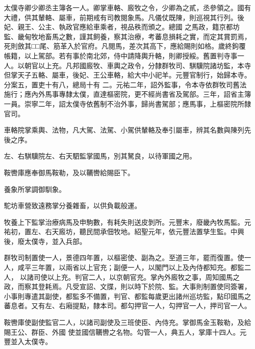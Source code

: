 \begin{pinyinscope}
 太僕寺卿少卿丞主簿各一人。卿掌車輅、廄牧之令，少卿為之貳，丞參領之。國有大禮，供其輦輅、屬車，前期戒有司教閱象馬。凡儀仗既陳，則巡視其行列。後妃、親王、公主、執政官應給車乘者，視品秩而頒之。總國
 之馬政，籍京都坊監、畿甸牧地畜馬之數，謹其飼養，察其治療，考蕃息損耗之實，而定其賞罰焉，死則斂其□□尾、筋革入於官府。凡閱馬，差次其高下，應給賜則如格。歲終鉤覆帳籍，以上駕部。若有事於南北郊，侍中請降輿升輅，則卿授綏。舊置判寺事一人。以朝官以上充。凡邦國廄牧、車輿之政令，分隸群牧司、騏驥院諸坊監，本寺但掌天子五輅、屬車，後妃、王公車輅，給大中小祀羊。元豐官制行，始歸本寺。分案五，置吏十有八，總局十有
 二。元祐二年，詔外監事，令本寺依群牧司舊法施行；應內外馬事專隸太僕，直達樞密院，更不經尚書省及駕部。三年，詔省主簿一員。崇寧二年，詔太僕寺依舊制不治外事，歸尚書駕部；應馬事，上樞密院所隸官司。



 車輅院掌乘輿、法物，凡大駕、法駕、小駕供輦輅及奉引屬車，辨其名數與陳列先後之序。



 左、右騏驥院左、右天駟監掌國馬，別其駑良，以待軍國之用。



 鞍轡庫應奉御馬鞍勒，及以韉轡給賜臣下。



 養象所掌調御馴象。



 駝坊車營致遠務掌分養雜畜，以供負載般運。



 牧養上下監掌治療病馬及申駒數，有耗失則送皮剝所。元豐末，廢畿內牧馬監。元祐初，置左、右天廄坊，聽民間承佃牧地。紹聖元年，依元豐法置孳生監。中興後，廢太僕寺，並入兵部。



 群牧司制置使一人，景德四年置，以樞密使、副為之。至道三年，罷而復置。使一人，咸平三年置，以兩省以上官充；副便一人，以閣門以上及內侍都知充。都監二人，
 以諸司使以上充。判官二人，以京朝官充。掌內外廄牧之事，周知國馬之政，而察其登耗焉。凡受宣詔、文牒，則以時下於院、監。大事則制置使同簽署，小事則專遣其副使，都監多不備置，判官、都監每歲更出諸州巡坊監，點印國馬之蕃息者。又有左、右廂提點，隸本司。都勾押官一人，勾押官一人，押司官一人。



 鞍轡庫使副使監官二人，以諸司副使及三班使臣、內侍充。掌御馬金玉鞍勒，及給賜王公、群臣、外國
 使並國信韉轡之名物。勾管一人，典五人，掌庫十四人。元豐並入太僕寺。



\end{pinyinscope}